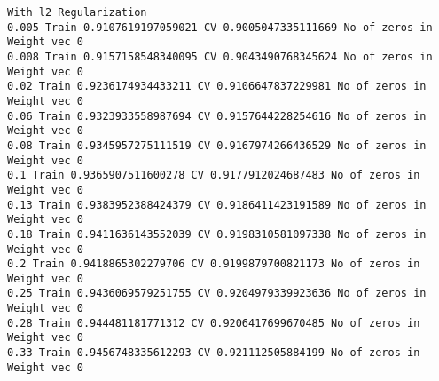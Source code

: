 \documentclass[11pt]{article}
\begin{document}
    \begin{Verbatim}[commandchars=\\\{\}]
With l2 Regularization
0.005 Train 0.9107619197059021 CV 0.9005047335111669 No of zeros in Weight vec 0
0.008 Train 0.9157158548340095 CV 0.9043490768345624 No of zeros in Weight vec 0
0.02 Train 0.9236174934433211 CV 0.9106647837229981 No of zeros in Weight vec 0
0.06 Train 0.9323933558987694 CV 0.9157644228254616 No of zeros in Weight vec 0
0.08 Train 0.9345957275111519 CV 0.9167974266436529 No of zeros in Weight vec 0
0.1 Train 0.9365907511600278 CV 0.9177912024687483 No of zeros in Weight vec 0
0.13 Train 0.9383952388424379 CV 0.9186411423191589 No of zeros in Weight vec 0
0.18 Train 0.9411636143552039 CV 0.9198310581097338 No of zeros in Weight vec 0
0.2 Train 0.9418865302279706 CV 0.9199879700821173 No of zeros in Weight vec 0
0.25 Train 0.9436069579251755 CV 0.9204979339923636 No of zeros in Weight vec 0
0.28 Train 0.944481181771312 CV 0.9206417699670485 No of zeros in Weight vec 0
0.33 Train 0.9456748335612293 CV 0.921112505884199 No of zeros in Weight vec 0

    \end{Verbatim}
\end{document}

